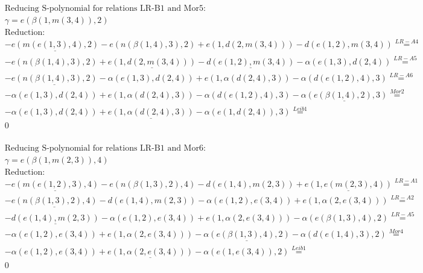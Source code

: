 \documentclass[11pt]{amsart}
\begin{document}
\begin{align*} 
& \text{Reducing S-polynomial for relations LR-B1 and Mor5:} \\ 
& \gamma = e(\beta(1,m(3,4)),2) \\ 
& \text{Reduction}: \\& - \underline{e(m(e(1,3),4),2)} - e(n(\beta(1,4),3),2) + e(1,d(2,m(3,4))) - d(e(1,2),m(3,4)) \stackrel{ LR-A4 }{=}  \\ 
& - e(n(\beta(1,4),3),2) + \underline{e(1,d(2,m(3,4)))} - \underline{d(e(1,2),m(3,4))} - \alpha(e(1,3),d(2,4)) \stackrel{ LR-A5 }{=}  \\ 
& - \underline{e(n(\beta(1,4),3),2)} - \alpha(e(1,3),d(2,4)) + e(1,\alpha(d(2,4),3)) - \alpha(d(e(1,2),4),3) \stackrel{ LR-A6 }{=}  \\ 
& - \alpha(e(1,3),d(2,4)) + e(1,\alpha(d(2,4),3)) - \alpha(d(e(1,2),4),3) - \underline{\alpha(e(\beta(1,4),2),3)} \stackrel{ Mor2 }{=}  \\ 
& - \alpha(e(1,3),d(2,4)) + \underline{e(1,\alpha(d(2,4),3))} - \alpha(e(1,d(2,4)),3) \stackrel{ Leib1 }{=}  \\ 
&0\\ 
\end{align*} 
 
\begin{align*} 
& \text{Reducing S-polynomial for relations LR-B1 and Mor6:} \\ 
& \gamma = e(\beta(1,m(2,3)),4) \\ 
& \text{Reduction}: \\& - \underline{e(m(e(1,2),3),4)} - e(n(\beta(1,3),2),4) - d(e(1,4),m(2,3)) + \underline{e(1,e(m(2,3),4))} \stackrel{ LR-A1 }{=}  \\ 
& - \underline{e(n(\beta(1,3),2),4)} - d(e(1,4),m(2,3)) - \alpha(e(1,2),e(3,4)) + e(1,\alpha(2,e(3,4))) \stackrel{ LR-A2 }{=}  \\ 
& - \underline{d(e(1,4),m(2,3))} - \alpha(e(1,2),e(3,4)) + e(1,\alpha(2,e(3,4))) - \alpha(e(\beta(1,3),4),2) \stackrel{ LR-A5 }{=}  \\ 
& - \alpha(e(1,2),e(3,4)) + e(1,\alpha(2,e(3,4))) - \underline{\alpha(e(\beta(1,3),4),2)} - \alpha(d(e(1,4),3),2) \stackrel{ Mor4 }{=}  \\ 
& - \alpha(e(1,2),e(3,4)) + \underline{e(1,\alpha(2,e(3,4)))} - \alpha(e(1,e(3,4)),2) \stackrel{ Leib1 }{=}  \\ 
&0\\ 
\end{align*} 
 
\end{document}
